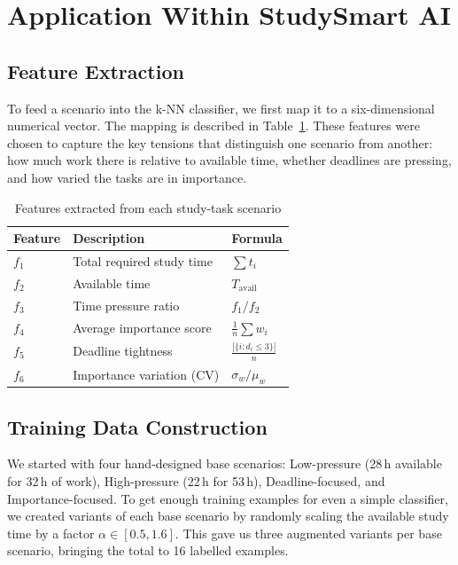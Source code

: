 \documentclass[12pt,a4paper]{article}
\begin{document}
\section{Application Within StudySmart AI}

\subsection{Feature Extraction}

To feed a scenario into the k-NN classifier, we first map it to a
six-dimensional numerical vector.  The mapping is described in
Table~\ref{tab:features}.  These features were chosen to capture the
key tensions that distinguish one scenario from another: how much work
there is relative to available time, whether deadlines are pressing,
and how varied the tasks are in importance.

\begin{table}[H]
\centering
\caption{Features extracted from each study-task scenario}
\label{tab:features}
\begin{tabular}{@{}lll@{}}
\toprule
\textbf{Feature} & \textbf{Description} & \textbf{Formula} \\
\midrule
$f_1$ & Total required study time & $\sum t_i$ \\
$f_2$ & Available time            & $T_{\text{avail}}$ \\
$f_3$ & Time pressure ratio       & $f_1 / f_2$ \\
$f_4$ & Average importance score  & $\frac{1}{n}\sum w_i$ \\
$f_5$ & Deadline tightness        & $\frac{|\{i : d_i \le 3\}|}{n}$ \\
$f_6$ & Importance variation (CV) & $\sigma_w / \mu_w$ \\
\bottomrule
\end{tabular}
\end{table}

\subsection{Training Data Construction}

We started with four hand-designed base scenarios: Low-pressure
(28\,h available for 32\,h of work), High-pressure (22\,h for 53\,h),
Deadline-focused, and Importance-focused.  To get enough training
examples for even a simple classifier, we created variants of each
base scenario by randomly scaling the available study time by a factor
\(\alpha \in [0.5, 1.6]\).  This gave us three augmented variants per
base scenario, bringing the total to 16 labelled examples.
\end{document}
